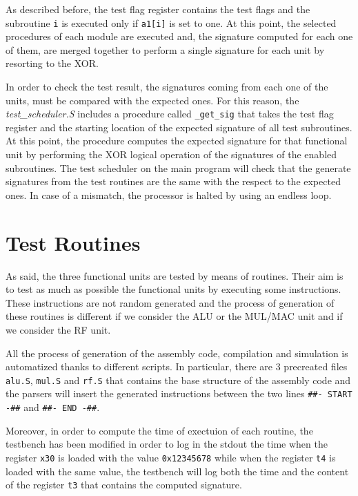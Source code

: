 \documentclass[paper=a4, fontsize=10pt]{scrartcl}	%
\begin{document}
	As described before, the test flag register contains the test flags and the subroutine \texttt{i} is executed only if \texttt{a1[i]} is set to one. At this point, the selected procedures of each module are executed and, the signature computed for each one of them, are merged together to perform a single signature for each unit by resorting to the XOR. 
	
	In order to check the test result, the signatures coming from each one of the units, must be compared with the expected ones. For this reason, the \textit{test\_scheduler.S} includes a procedure called \texttt{\_get\_sig} that takes the test flag register and the starting location of the expected signature of all test subroutines. At this point, the procedure computes the expected signature for that functional unit by performing the XOR logical operation of the signatures of the enabled subroutines. The test scheduler on the main program will check that the generate signatures from the test routines are the same with the respect to the expected ones. In case of a mismatch, the processor is halted by using an endless loop.

	\section{Test Routines}
	As said, the three functional units are tested by means of routines. Their aim is to test as much as possible the functional units by executing some instructions. These instructions are not random generated and the process of generation of these routines is different if we consider the ALU or the MUL/MAC unit and if we consider the RF unit. \newline

	All the process of generation of the assembly code, compilation and simulation is automatized thanks to different scripts. In particular, there are 3 precreated files \texttt{alu.S}, \texttt{mul.S} and \texttt{rf.S} that contains the base structure of the assembly code and the parsers will insert the generated instructions between the two lines \texttt{\#\#- START -\#\#} and \texttt{\#\#- END -\#\#}.\newline

	Moreover, in order to compute the time of exectuion of each routine, the testbench has been modified in order to log in the stdout the time when the register \texttt{x30} is loaded with the value \texttt{0x12345678} while when the register \texttt{t4} is loaded with the same value, the testbench will log both the time and the content of the register \texttt{t3} that contains the computed signature.
\end{document}
